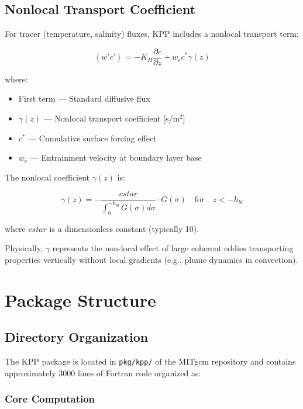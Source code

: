 \documentclass[11pt, a4paper]{article}
\begin{document}
\subsection{Nonlocal Transport Coefficient}

For tracer (temperature, salinity) fluxes, KPP includes a nonlocal transport term:

\begin{equation}
\left\langle w'c' \right\rangle = -K_H \frac{\partial c}{\partial z} + w_e c^* \gamma(z)
\end{equation}

where:

\begin{itemize}
    \item First term — Standard diffusive flux
    \item $\gamma(z)$ — Nonlocal transport coefficient [s/m$^2$]
    \item $c^*$ — Cumulative surface forcing effect
    \item $w_e$ — Entrainment velocity at boundary layer base
\end{itemize}

The nonlocal coefficient $\gamma(z)$ is:

\begin{equation}
\gamma(z) = -\frac{cstar}{\int_0^{-h_{bl}} G(\sigma) d\sigma} \cdot G(\sigma) \quad \text{for} \quad z < -h_{bl}
\end{equation}

where $cstar$ is a dimensionless constant (typically 10).

Physically, $\gamma$ represents the non-local effect of large coherent eddies transporting properties vertically without local gradients (e.g., plume dynamics in convection).

\section{Package Structure}

\subsection{Directory Organization}

The KPP package is located in \texttt{pkg/kpp/} of the MITgcm repository and contains approximately 3000 lines of Fortran code organized as:

\subsubsection{Core Computation}
\end{document}
